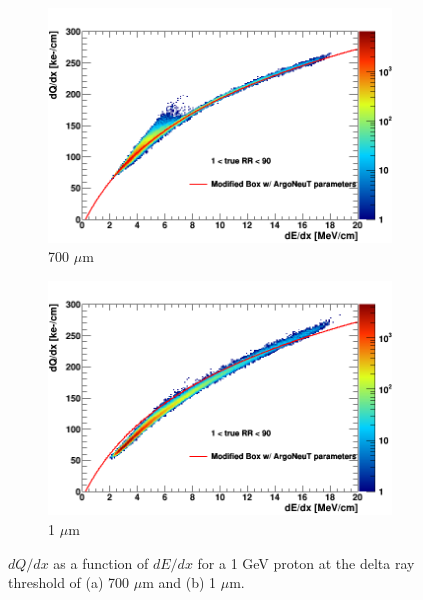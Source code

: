 \begin{figure}[ht!]
        \centering
        \begin{subfigure}[b]{0.495\textwidth}
            \centering
            \includegraphics[width=\textwidth]{proton_700um}
            \caption{700 $\mu$m}%
            \label{fig:proton_2d_700}
        \end{subfigure}
        \hfill
        \begin{subfigure}[b]{0.495\textwidth}  
            \centering 
            \includegraphics[width=\textwidth]{proton_1um}
            \caption{1 $\mu$m}%
            \label{fig:proton_2d_1}
        \end{subfigure}
	\caption[Charge to Energy Loss Conversion of a 1 GeV Proton]{$dQ/dx$ as a function of $dE/dx$ for a 1 GeV proton at the delta ray threshold of (a) 700 $\mu$m and (b) 1 $\mu$m.}
        \label{fig:proton_2d}

\end{figure}
